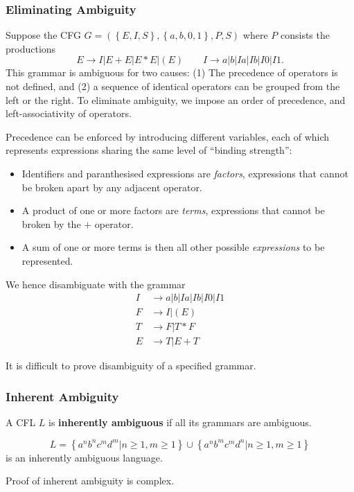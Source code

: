 \subsubsection{Eliminating Ambiguity}
\begin{example}
  Suppose the CFG $G=\left( \left\{ E,I,S \right\} ,\left\{ a,b,0,1 \right\} ,P,S \right) $ where
  $P$ consists the productions
  \[E \to I|E+E|E*E|(E)\qquad I\to a|b|Ia|Ib|I0|I1.\]
  This grammar is ambiguous for two causes: (1) The precedence of operators is
  not defined, and (2) a sequence of identical operators can be grouped from the
  left or the right. To eliminate ambiguity, we impose an order of precedence, and
  left-associativity of operators.

  Precedence can be enforced by introducing different variables,
  each of which represents expressions sharing the same level of ``binding strength'':
  \begin{itemize}
    \item Identifiers and paranthesised expressions are \textit{factors},
      expressions that cannot be broken apart by any adjacent operator.
    \item A product of one or more factors are \textit{terms}, expressions that
      cannot be broken by the $+$ operator.
    \item A sum of one or more terms is then all other possible \textit{expressions} to be
      represented.
  \end{itemize}
  We hence disambiguate with the grammar
  \begin{align*}
    I&\to a|b|Ia|Ib|I0|I1\\
    F&\to I|(E)\\
    T&\to F|T*F\\
    E&\to T|E+T
  \end{align*}
\end{example}

\begin{remark}
  It is difficult to prove disambiguity of a specified grammar.
\end{remark}

\subsubsection{Inherent Ambiguity}
\begin{definition}
  A CFL $L$ is \textbf{inherently ambiguous} if all its grammars are ambiguous.
\end{definition}
\begin{example}
   \[L=\left\{ a^{n}b^{n}c^{m}d^{m}|n\ge 1,m\ge 1 \right\} \cup \left\{ a^{n}b^{m}c^{m}d^{n}|n\ge 1,m\ge 1 \right\}\] 
   is an inherently ambiguous language. 
\end{example}
\begin{remark}
  Proof of inherent ambiguity is complex.
\end{remark}


